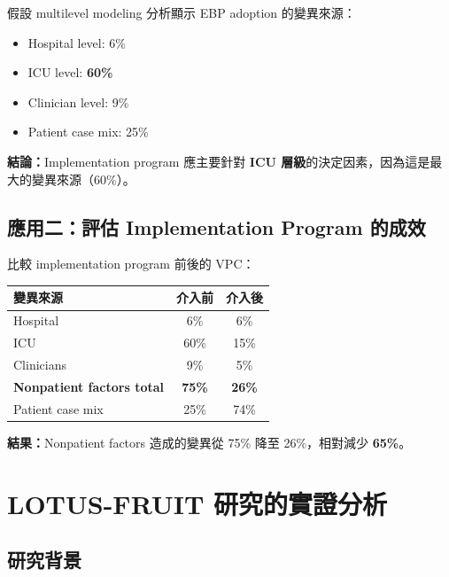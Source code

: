 \documentclass[12pt,a4paper]{article}
\begin{document}
\begin{tcolorbox}[colback=highlight_yellow,colframe=emergency_red,title=\textbf{假設範例}]
假設 multilevel modeling 分析顯示 EBP adoption 的變異來源：
\begin{itemize}[nosep]
    \item Hospital level: 6\%
    \item ICU level: \textbf{60\%}
    \item Clinician level: 9\%
    \item Patient case mix: 25\%
\end{itemize}

\textbf{結論：}Implementation program 應主要針對 \textbf{ICU 層級}的決定因素，因為這是最大的變異來源（60\%）。
\end{tcolorbox}

\subsection{應用二：評估 Implementation Program 的成效}

比較 implementation program 前後的 VPC：

\begin{longtable}{lcc}
\toprule
\textbf{變異來源} & \textbf{介入前} & \textbf{介入後} \\
\midrule
\endfirsthead
\bottomrule
\endfoot

Hospital & 6\% & 6\% \\
ICU & 60\% & 15\% \\
Clinicians & 9\% & 5\% \\
\midrule
\textbf{Nonpatient factors total} & \textbf{75\%} & \textbf{26\%} \\
\midrule
Patient case mix & 25\% & 74\% \\
\bottomrule
\end{longtable}

\textbf{結果：}Nonpatient factors 造成的變異從 75\% 降至 26\%，相對減少 \textbf{65\%}。

\section{LOTUS-FRUIT 研究的實證分析}

\subsection{研究背景}
\end{document}
